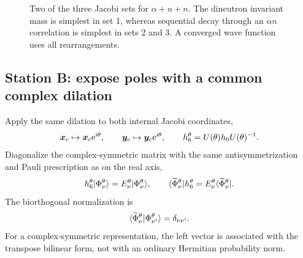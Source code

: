 \begin{figure}[t]
  \centering
  \caption{Two of the three Jacobi sets for $\alpha+n+n$.  The dineutron
  invariant mass is simplest in set 1, whereas sequential decay through an
  $\alpha n$ correlation is simplest in sets 2 and 3.  A converged wave
  function uses all rearrangements.}
  \label{fig:he6-jacobi-sets}
\end{figure}

\subsection{Station B: expose poles with a common complex dilation}
\label{subsec:he6-complex-scaling}

Apply the same dilation to both internal Jacobi coordinates,
\begin{equation}
  \bm x_c\mapsto\bm x_c\mathrm{e}^{\mathrm{i}\theta},
  \qquad
  \bm y_c\mapsto\bm y_c\mathrm{e}^{\mathrm{i}\theta},
  \qquad
  h_6^\theta=U(\theta)h_6U(\theta)^{-1}.
  \label{eq:he6-complex-dilation}
\end{equation}
Diagonalize the complex-symmetric matrix with the same antisymmetrization and
Pauli prescription as on the real axis,
\begin{equation}
  h_6^\theta\lvert \Phi_\nu^\theta \rangle
  =E_\nu^\theta\lvert \Phi_\nu^\theta \rangle,
  \qquad
  \langle \widetilde\Phi_\nu^\theta \rvert h_6^\theta
  =E_\nu^\theta\langle \widetilde\Phi_\nu^\theta \rvert.
  \label{eq:he6-csm-eigenproblem}
\end{equation}
The biorthogonal normalization is
\begin{equation}
  \langle \widetilde\Phi_\nu^\theta
  |\Phi_{\nu'}^\theta \rangle=\delta_{\nu\nu'}.
  \label{eq:he6-biorthogonal-normalization}
\end{equation}
For a complex-symmetric representation, the left vector is associated with
the transpose bilinear form, not with an ordinary Hermitian probability
norm.

